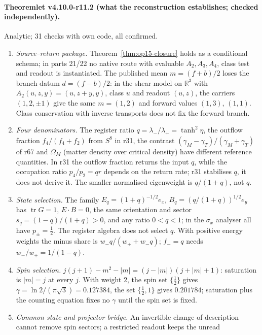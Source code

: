 \paragraph{Theoremlet v4.10.0-r11.2 (what the reconstruction establishes; checked independently).}
Analytic; 31 checks with own code, all confirmed.
\begin{enumerate}[leftmargin=2em]
\item[(a)] \emph{Source--return package.}  Theorem~\ref{thm:op15-closure} holds as a conditional schema; in parts 21/22 no native route with evaluable
\(A_2,A_3,A_4\), class test and readout is instantiated.  The published mean \(m=(f+b)/2\) loses the branch datum \(d=(f-b)/2\): in the shear model on
\(\mathbb R^3\) with \(A_2(u,z,y)=(u,z+y,y)\), class \(u\) and readout \((u,z)\), the carriers \((1,2,\pm1)\) give the same \(m=(1,2)\) and forward values
\((1,3)\), \((1,1)\).  Class conservation with inverse transports does not fix the forward branch.
\item[(b)] \emph{Four denominators.}  The register ratio \(q=\lambda_-/\lambda_+=\tanh^2\eta\), the outflow fraction \(f_4/(f_4+f_2)\) from \(S^8\) in r31,
the contrast \((\gamma_M-\gamma_T)/(\gamma_M+\gamma_T)\) of r67 and \(\Omega_M\) (matter density over critical density) have different reference quantities.
In r31 the outflow fraction returns the input \(q\), while the occupation ratio \(p_4/p_2=qr\) depends on the return rate; r31 stabilises \(q\), it does
not derive it.  The smaller normalised eigenweight is \(q/(1+q)\), not \(q\).
\item[(c)] \emph{State selection.}  The family \(E_q=(1+q)^{-1/2}e_x\), \(B_q=(q/(1+q))^{1/2}e_y\) has \(\operatorname{tr}G=1\), \(E\cdot B=0\), the same
orientation and sector \(s_q=(1-q)/(1+q)>0\), and any ratio \(0<q<1\); in the \(\sigma_x\) analyser all have \(p_\pm=\tfrac12\).  The register algebra does
not select \(q\).  With positive energy weights the minus share is \(w_-q/(w_++w_-q)\); \(f_-=q\) needs \(w_-/w_+=1/(1-q)\).
\item[(d)] \emph{Spin selection.}  \(j(j+1)-m^2-|m|=(j-|m|)(j+|m|+1)\): saturation is \(|m|=j\) at every \(j\).  With weight 2, the spin set
\(\{\tfrac12\}\) gives \(\gamma=\ln2/(\pi\sqrt3)=0.127384\), the set \(\{\tfrac12,1\}\) gives \(0.201784\); saturation plus the counting equation fixes no
\(\gamma\) until the spin set is fixed.
\item[(e)] \emph{Common state and projector bridge.}  An invertible change of description cannot remove spin sectors; a restricted readout keeps the unread

\end{enumerate}
